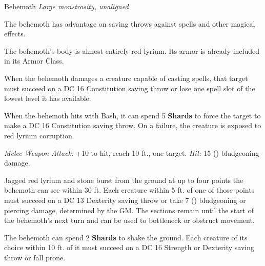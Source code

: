 \documentclass{apotheosis-book}
\begin{document}
\begin{monsterbox}{Behemoth}
\textit{Large monstrosity, unaligned}\\
\rpghline
\basics[
  armorclass = 10 (lyrium hide),
  hitpoints = 120,
  speed = 35 ft.
]
\rpghline
\stats[
  STR = \stat{26},
  DEX = \stat{10},
  CON = \stat{26},
  INT = \stat{8},
  WIS = \stat{12},
  CHA = \stat{8}
]
\rpghline
\details[
  skills = Athletics +10,
  senses = passive Perception 11,
  languages = understands Common but can't speak,
  challenge = 10
]
\rpghline

\begin{rpg-monsteraction}
The behemoth has advantage on saving throws against spells and other magical effects.
\end{rpg-monsteraction}

\begin{rpg-monsteraction}
The behemoth's body is almost entirely red lyrium. Its armor is already included in its Armor Class.
\end{rpg-monsteraction}

\begin{rpg-monsteraction}
When the behemoth damages a creature capable of casting spells, that target must succeed on a DC 16 Constitution saving throw or lose one spell slot of the lowest level it has available.
\end{rpg-monsteraction}

\begin{rpg-monsteraction}
When the behemoth hits with Bash, it can spend 5 \textbf{Shards} to force the target to make a DC 16 Constitution saving throw. On a failure, the creature is exposed to red lyrium corruption.
\end{rpg-monsteraction}


\begin{rpg-monsteraction}[Bash]
\textit{Melee Weapon Attack:} +10 to hit, reach 10 ft., one target. \textit{Hit:} 15 () bludgeoning damage.
\end{rpg-monsteraction}

\begin{rpg-monsteraction}
Jagged red lyrium and stone burst from the ground at up to four points the behemoth can see within 30 ft. Each creature within 5 ft. of one of those points must succeed on a DC 13 Dexterity saving throw or take 7 () bludgeoning or piercing damage, determined by the GM. The sections remain until the start of the behemoth's next turn and can be used to bottleneck or obstruct movement.
\end{rpg-monsteraction}


\begin{rpg-monsteraction}[Quake]
The behemoth can spend 2 \textbf{Shards} to shake the ground. Each creature of its choice within 10 ft. of it must succeed on a DC 16 Strength or Dexterity saving throw or fall prone.
\end{rpg-monsteraction}

\end{monsterbox}
\end{document}
